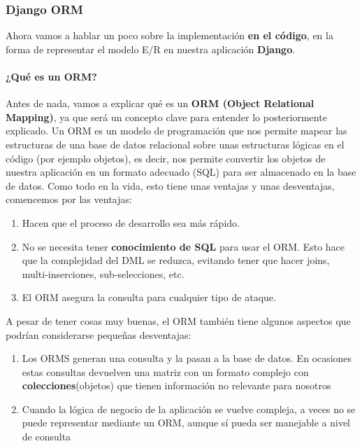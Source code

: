     \subsubsection{Django ORM}

    Ahora vamos a hablar un poco sobre la implementación \textbf{en el código}, en la forma
    de representar el modelo E/R en nuestra aplicación \textbf{Django}.\\

    \paragraph{¿Qué es un ORM?} \underline{}                                            
    \newline Antes de nada, vamos a explicar qué es un \textbf{ORM (Object Relational Mapping)}, ya
    que será un concepto clave para entender lo posteriormente explicado. Un ORM es un modelo
    de programación que nos permite mapear las estructuras de una base de datos relacional
    sobre unas estructuras lógicas en el código (por ejemplo objetos), es decir, nos permite
    convertir los objetos de nuestra aplicación en un formato adecuado (SQL) para ser
    almacenado en la base de datos. Como todo en la vida, esto tiene unas ventajas y unas
    desventajas, comencemos por las ventajas:

        \begin{enumerate}
            \item Hacen que el proceso de desarrollo sea más rápido.
            \item No se necesita tener \textbf{conocimiento de SQL} para usar el ORM. Esto
            hace que la complejidad del DML se reduzca, evitando tener que hacer joins,
            multi-inserciones, sub-selecciones, etc.
            \item El ORM asegura la consulta para cualquier tipo de ataque.
        \end{enumerate}

    A pesar de tener cosas muy buenas, el ORM también tiene algunos aspectos que podrían
    considerarse pequeñas desventajas:

        \begin{enumerate}
            \item Los ORMS generan una consulta y la pasan a la base de datos. En ocasiones
            estas consultas devuelven una matriz con un formato complejo con
            \textbf{colecciones}(objetos) que tienen información no relevante para nosotros
            \item Cuando la lógica de negocio de la aplicación se vuelve compleja, a veces
            no se puede representar mediante un ORM, aunque sí pueda ser manejable a nivel
            de consulta
        \end{enumerate}

